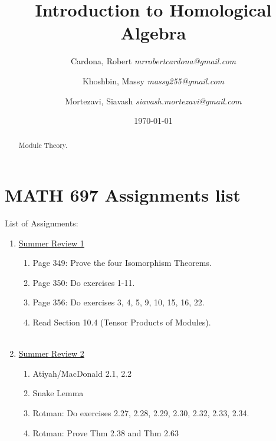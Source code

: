 \documentclass[8pt]{amsart}
\theoremstyle{plain}%
\theoremstyle{definition}
\theoremstyle{remark}
\numberwithin{equation}{section}
\begin{document}
\title[MATH 697]{Introduction to Homological Algebra}


\author{
	Cardona, Robert \textit{mrrobertcardona@gmail.com}
	\and
	Khoshbin, Massy \textit{massy255@gmail.com}
	\and
	Mortezavi, Siavash \textit{siavash.mortezavi@gmail.com}
}


\address{Department of Mathematics \\ California State University Long Beach}

\date{\today}

\begin{abstract}
Module Theory.
\end{abstract}

\maketitle

\setcounter{section}{0}
\section{MATH 697 Assignments list}

List of Assignments:\\
\begin{enumerate}
\item \underline{Summer Review 1}\\
		\begin{enumerate}
		\item Page 349: Prove the four Isomorphism Theorems.
		\item Page 350: Do exercises 1-11.
		\item Page 356: Do exercises 3, 4, 5, 9, 10, 15, 16, 22.
		\item Read Section 10.4 (Tensor Products of Modules).\\
		\\
		\end{enumerate}
\item \underline{Summer Review 2}\\
		\begin{enumerate}
		\item Atiyah/MacDonald 2.1, 2.2
		\item Snake Lemma
		\item Rotman: Do exercises 2.27, 2.28, 2.29, 2.30, 2.32, 2.33, 2.34.
		\item Rotman: Prove Thm 2.38 and Thm 2.63
		\end{enumerate}				
\end{enumerate}
\end{document}
